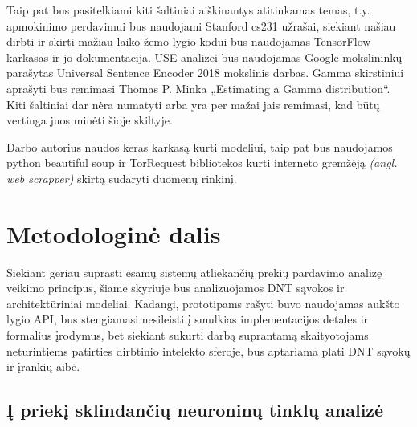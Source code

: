 \documentclass{VUMIFPSkursinis}
\begin{document}
Taip pat bus pasitelkiami kiti šaltiniai aiškinantys atitinkamas temas, t.y. apmokinimo perdavimui bus naudojami Stanford cs231 užrašai, siekiant našiau dirbti ir skirti mažiau laiko žemo  lygio kodui bus naudojamas TensorFlow karkasas ir jo dokumentacija. USE analizei bus naudojamas Google mokslininkų parašytas Universal Sentence Encoder 2018 mokslinis darbas. Gamma skirstiniui aprašyti bus remimasi Thomas P. Minka „Estimating a Gamma distribution“. Kiti šaltiniai dar nėra numatyti arba yra per mažai jais remimasi, kad būtų vertinga juos minėti šioje skiltyje.

Darbo autorius naudos keras karkasą kurti modeliui, taip pat bus naudojamos python beautiful soup ir TorRequest bibliotekos kurti interneto gremžėją \textit{(angl. web scrapper)} skirtą sudaryti duomenų rinkinį. 


\section{Metodologinė dalis}


Siekiant geriau suprasti esamų sistemų atliekančių prekių pardavimo analizę veikimo principus, šiame skyriuje bus analizuojamos DNT sąvokos ir architektūriniai modeliai. Kadangi, prototipams rašyti buvo naudojamas aukšto lygio API, bus stengiamasi nesileisti į smulkias implementacijos detales ir formalius įrodymus, bet siekiant sukurti darbą suprantamą skaityotojams neturintiems patirties dirbtinio intelekto sferoje, bus aptariama plati DNT sąvokų ir įrankių aibė.

\subsection{Į priekį sklindančių neuroninų tinklų analizė}
\end{document}
